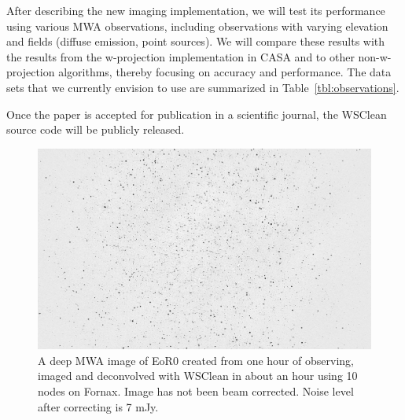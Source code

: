 \documentclass[a4paper,10pt]{article}
\begin{document}
After describing the new imaging implementation, we will test its performance using various MWA observations, including observations with varying elevation and fields (diffuse emission, point sources). We will compare these results with the results from the w-projection implementation in CASA and to other non-w-projection algorithms, thereby focusing on accuracy and performance. The data sets that we currently envision to use are summarized in Table~\ref{tbl:observations}.

Once the paper is accepted for publication in a scientific journal, the WSClean source code will be publicly released.

\begin{figure}[bh]
\begin{center}
\includegraphics[width=12cm]{EoR0-apparent.png}
\caption{A deep MWA image of EoR0 created from one hour of observing, imaged and deconvolved with WSClean in about an hour using 10 nodes on Fornax. Image has not been beam corrected. Noise level after correcting is 7 mJy.}
\label{fig:stddev-spectrum}
\end{center}
\end{figure}
\end{document}
